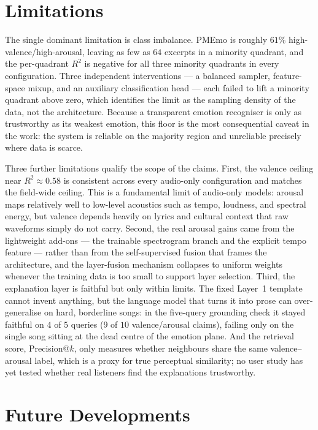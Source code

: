 \documentclass[12pt]{report}
\begin{document}
\section{Limitations}
\label{sec:conclusions-limitations}

The single dominant limitation is class imbalance. PMEmo is roughly $61\%$ high-valence/high-arousal, leaving as few as $64$ excerpts in a minority quadrant, and the per-quadrant $R^{2}$ is negative for all three minority quadrants in every configuration. Three independent interventions --- a balanced sampler, feature-space mixup, and an auxiliary classification head --- each failed to lift a minority quadrant above zero, which identifies the limit as the sampling density of the data, not the architecture. Because a transparent emotion recogniser is only as trustworthy as its weakest emotion, this floor is the most consequential caveat in the work: the system is reliable on the majority region and unreliable precisely where data is scarce.

Three further limitations qualify the scope of the claims. First, the valence ceiling near $R^{2}\approx0.58$ is consistent across every audio-only configuration and matches the field-wide ceiling. This is a fundamental limit of audio-only models: arousal maps relatively well to low-level acoustics such as tempo, loudness, and spectral energy, but valence depends heavily on lyrics and cultural context that raw waveforms simply do not carry. Second, the real arousal gains came from the lightweight add-ons --- the trainable spectrogram branch and the explicit tempo feature --- rather than from the self-supervised fusion that frames the architecture, and the layer-fusion mechanism collapses to uniform weights whenever the training data is too small to support layer selection. Third, the explanation layer is faithful but only within limits. The fixed Layer~1 template cannot invent anything, but the language model that turns it into prose can over-generalise on hard, borderline songs: in the five-query grounding check it stayed faithful on $4$ of $5$ queries ($9$ of $10$ valence/arousal claims), failing only on the single song sitting at the dead centre of the emotion plane. And the retrieval score, Precision@$k$, only measures whether neighbours share the same valence--arousal label, which is a proxy for true perceptual similarity; no user study has yet tested whether real listeners find the explanations trustworthy.

\section{Future Developments}
\label{sec:conclusions-future}
\end{document}

